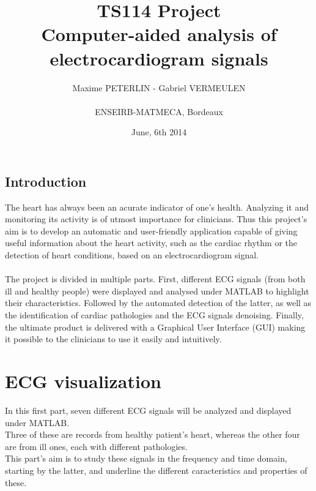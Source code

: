 \documentclass[11pt]{report}
\title{\textbf{TS114 Project}\\Computer-aided analysis of electrocardiogram signals}
\author{{Maxime PETERLIN - Gabriel VERMEULEN }\\\\{ENSEIRB-MATMECA, Bordeaux}}
\date{June, 6th 2014}
\begin{document}
\maketitle

\tableofcontents

\newpage
\vspace{1in}
\vspace{1in}
\section*{\Huge{Introduction}}
	\vspace{0.5in}
	The heart has always been an acurate indicator of one's health. Analyzing it and monitoring its activity is of utmost importance for clinicians. Thus this project's aim is to develop an automatic and user-friendly application capable of giving useful information about the heart activity, such as the cardiac rhythm or the detection of heart conditions, based on an electrocardiogram signal.\\\\
	The project is divided in multiple parts. First, different ECG signals (from both ill and healthy people) were displayed and analysed under MATLAB to highlight their characteristics. Followed by the automated detection of the latter, as well as the identification of cardiac pathologies and the ECG signals denoising. Finally, the ultimate product is delivered with a Graphical User Interface (GUI) making it possible to the clinicians to use it easily and intuitively.\\


\chapter{ECG visualization}
	In this first part, seven different ECG signals will be analyzed and displayed under MATLAB. \\Three of these are records from healthy patient's heart, whereas the other four are from ill ones, each with different pathologies.\\
	This part's aim is to study these signals in the frequency and time domain, starting by the latter, and underline the different caracteristics and properties of these.
\end{document}
